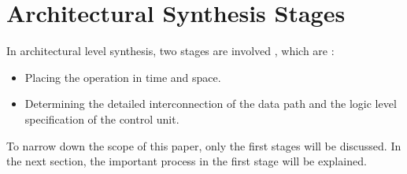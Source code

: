 \section{Architectural Synthesis Stages}
In architectural level synthesis, two stages are involved \cite{main}, which are :

\begin{itemize}
    \item Placing the operation in time and space.
    \item Determining the detailed interconnection of the data path and the logic level specification of the control unit.
\end{itemize}

To narrow down the scope of this paper, only the first stages will be discussed. In the next section, the important process in the first stage will be explained. 